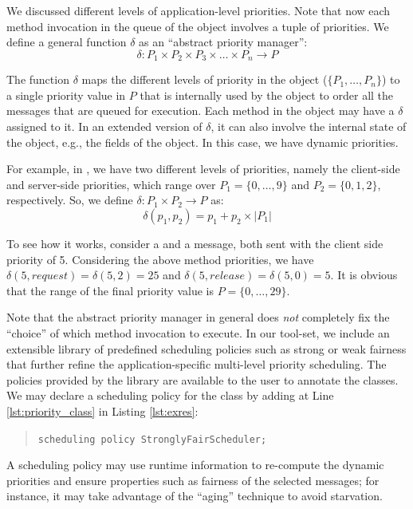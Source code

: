 We discussed different levels of application-level priorities. 
Note that now each method invocation in
the queue of the object involves a tuple of priorities.
We define a general function $\delta$ as an ``abstract priority manager'':
%
\[ \delta : P_1 \times P_2 \times P_3 \times \ldots \times P_n \longrightarrow  P \]

The function $\delta$ maps the different levels of priority in the object
($\{P_1,\ldots,P_n\}$) to a single priority value in $P$ that is internally used by the
object to order all the messages that are queued for execution. Each
method in the object may have a $\delta$ assigned to it. In an extended
version of $\delta$, it can also involve the internal state of the object,
e.g., the fields of the object. 
In this case, we have dynamic priorities.

For example, in {}, we have two different levels of priorities, namely  the client-side and server-side priorities, which range over $P_1 = \{0, \ldots, 9\}$ and $P_2 = \{0, 1, 2\}$, respectively. 
So, we define $\delta: P_1 \times P_2 \rightarrow P$ as:
%
\[
\delta(p_1, p_2) = p_1 + p_2 \times |P_1|
\]

To see how it works, consider a  and a  message, both sent with the client side priority of 5. 
Considering the above method priorities, we have $\delta(5, request) = \delta(5,2) = 25$ and  $\delta(5, release) = \delta(5,0) = 5$.
It is obvious that the range of the final priority value is $P = \{0,\ldots,29\}$.

Note that the abstract priority manager in general does \textit{not} completely
fix the ``choice'' of which method invocation to execute. 
In our tool-set, we include an extensible library of predefined scheduling policies such as strong or weak fairness that further refine the application-specific multi-level priority scheduling. 
The policies provided by the library are available to the user to annotate the classes.
We may declare a scheduling policy for the  class by adding at Line
\ref{lst:priority_class} in Listing \ref{lst:exres}: 
%
\begin{quote}
\lstinline{scheduling policy StronglyFairScheduler;} 
\end{quote} 

A scheduling policy may
use runtime information to re-compute the dynamic priorities and ensure
properties such as fairness of the selected messages; for instance, it may
take advantage of the ``aging'' technique to avoid starvation. 

